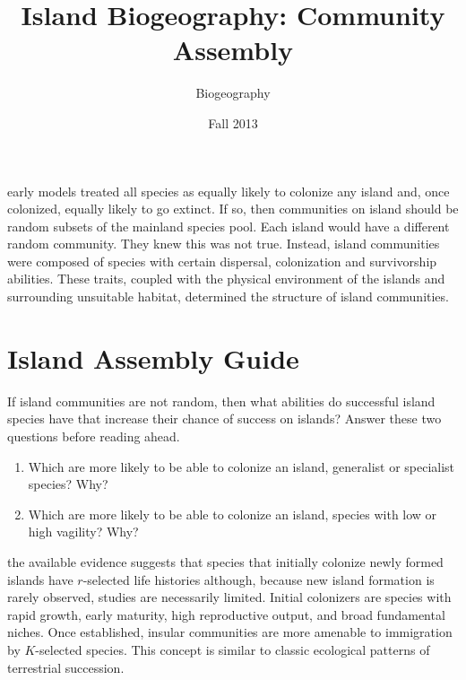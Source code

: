 \documentclass[letterpaper]{tufte-handout}
\title{Island Biogeography: Community Assembly}
\author[Biogeography]{Biogeography}
\date{Fall 2013} %
\begin{document}
\maketitle	%



 early models treated all species as equally likely to colonize any island and, once colonized, equally likely to go extinct. If so, then communities on island should be random subsets of the mainland species pool.  Each island would have a different random community.  They knew this was not true.  Instead, island communities were composed of species with certain dispersal, colonization and survivorship abilities.  These traits, coupled with the physical environment of the islands and surrounding unsuitable habitat, determined the structure of island communities. 

\section{Island Assembly Guide}

If island communities are not random, then what abilities do successful island species have that increase their chance of success on islands?  Answer these two questions before reading ahead.
\begin{enumerate}
	\item Which are more likely to be able to colonize an island, generalist or specialist species? Why?
	\item Which are more likely to be able to colonize an island, species with low or high vagility? Why?  
\end{enumerate}
	
the available evidence suggests that species that initially colonize newly formed islands have $r$-selected life histories although, because new island formation is rarely observed, studies are necessarily limited. Initial colonizers are species with rapid growth, early maturity, high reproductive output, and broad fundamental niches.  Once established, insular communities are more amenable to immigration by $K$-selected species. This concept is similar to classic ecological patterns of terrestrial succession.  
\end{document}
